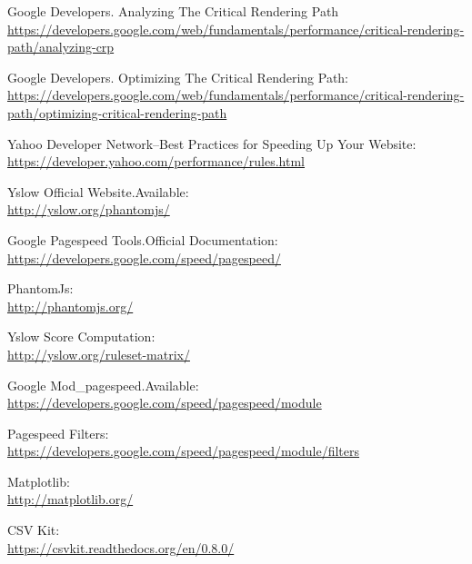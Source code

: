 \documentclass[conference]{IEEEtran}
\begin{document}
\begin{thebibliography}{1}
Google Developers. Analyzing The Critical Rendering Path\\
\href{
https://developers.google.com/web/fundamentals/performance/critical-rendering-path/analyzing-crp}
{https://developers.google.com/web/fundamentals/performance/critical-rendering-path/analyzing-crp}

Google Developers. Optimizing The Critical Rendering Path:\\
\href{
https://developers.google.com/web/fundamentals/performance/critical-rendering-path/optimizing-critical-rendering-path}
{https://developers.google.com/web/fundamentals/performance/critical-rendering-path/optimizing-critical-rendering-path}

Yahoo Developer Network--Best Practices for Speeding Up Your Website:\\
\href{https://developer.yahoo.com/performance/rules.html}{
https://developer.yahoo.com/performance/rules.html}

Yslow Official Website.Available:\\
\href{http://yslow.org/phantomjs/}{http://yslow.org/phantomjs/
}

Google Pagespeed Tools.Official Documentation:\\
\href{https://developers.google.com/speed/pagespeed/}{
https://developers.google.com/speed/pagespeed/}

PhantomJs:\\
\href{http://phantomjs.org/}
{http://phantomjs.org/}

Yslow Score Computation:\\
\href{http://yslow.org/ruleset-matrix/}
{http://yslow.org/ruleset-matrix/}

Google Mod\_pagespeed.Available:\\
\href{
https://developers.google.com/speed/pagespeed/module}{
https://developers.google.com/speed/pagespeed/module}
 
Pagespeed Filters:\\
\href{https://developers.google.com/speed/pagespeed/module/filters}
{https://developers.google.com/speed/pagespeed/module/filters}

Matplotlib:\\
\href{http://matplotlib.org/}
{http://matplotlib.org/}

CSV Kit:\\
\href{https://csvkit.readthedocs.org/en/0.8.0/}
{https://csvkit.readthedocs.org/en/0.8.0/}
% 
% 
% 

\end{thebibliography}
\end{document}
